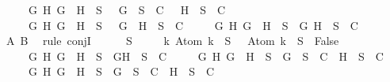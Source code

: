 \begin{isabellebody}
\ \ \ \ {\isasymand}\ {\isacharparenleft}{\isasymforall}G\ H{\isachardot}\ \isactrlbold {\isasymnot}{\isacharparenleft}G\ \isactrlbold {\isasymand}\ H{\isacharparenright}\ {\isasymin}\ S\ {\isasymlongrightarrow}\ {\isacharbraceleft}\isactrlbold {\isasymnot}\ G{\isacharbraceright}\ {\isasymunion}\ S\ {\isasymin}\ C\ {\isasymor}\ {\isacharbraceleft}\isactrlbold {\isasymnot}\ H{\isacharbraceright}\ {\isasymunion}\ S\ {\isasymin}\ C{\isacharparenright}\isanewline
\ \ \ \ {\isasymand}\ {\isacharparenleft}{\isasymforall}G\ H{\isachardot}\ \isactrlbold {\isasymnot}{\isacharparenleft}G\ \isactrlbold {\isasymor}\ H{\isacharparenright}\ {\isasymin}\ S\ {\isasymlongrightarrow}\ {\isacharbraceleft}\isactrlbold {\isasymnot}\ G{\isacharcomma}\ \isactrlbold {\isasymnot}\ H{\isacharbraceright}\ {\isasymunion}\ S\ {\isasymin}\ C{\isacharparenright}\isanewline
\ \ \ \ {\isasymand}\ {\isacharparenleft}{\isasymforall}G\ H{\isachardot}\ \isactrlbold {\isasymnot}{\isacharparenleft}G\ \isactrlbold {\isasymrightarrow}\ H{\isacharparenright}\ {\isasymin}\ S\ {\isasymlongrightarrow}\ {\isacharbraceleft}G{\isacharcomma}\isactrlbold {\isasymnot}\ H{\isacharbraceright}\ {\isasymunion}\ S\ {\isasymin}\ C{\isacharparenright}{\isacharparenright}{\isachardoublequoteclose}\isanewline
\ \ \ \ \isamarkupfalse%
\ A\ B\ \isamarkupfalse%
\ {\isacharparenleft}rule\ conjI{\isacharparenright}\isanewline
\ \ \isamarkupfalse%
\ {\isachardoublequoteopen}{\isasymbottom}\ {\isasymnotin}\ S\isanewline
\ \ \ \ {\isasymand}\ {\isacharparenleft}{\isasymforall}k{\isachardot}\ Atom\ k\ {\isasymin}\ S\ {\isasymlongrightarrow}\ \isactrlbold {\isasymnot}\ {\isacharparenleft}Atom\ k{\isacharparenright}\ {\isasymin}\ S\ {\isasymlongrightarrow}\ False{\isacharparenright}\isanewline
\ \ \ \ {\isasymand}\ {\isacharparenleft}{\isasymforall}G\ H{\isachardot}\ G\ \isactrlbold {\isasymand}\ H\ {\isasymin}\ S\ {\isasymlongrightarrow}\ {\isacharbraceleft}G{\isacharcomma}H{\isacharbraceright}\ {\isasymunion}\ S\ {\isasymin}\ C{\isacharparenright}\isanewline
\ \ \ \ {\isasymand}\ {\isacharparenleft}{\isasymforall}G\ H{\isachardot}\ G\ \isactrlbold {\isasymor}\ H\ {\isasymin}\ S\ {\isasymlongrightarrow}\ {\isacharbraceleft}G{\isacharbraceright}\ {\isasymunion}\ S\ {\isasymin}\ C\ {\isasymor}\ {\isacharbraceleft}H{\isacharbraceright}\ {\isasymunion}\ S\ {\isasymin}\ C{\isacharparenright}\isanewline
\ \ \ \ {\isasymand}\ {\isacharparenleft}{\isasymforall}G\ H{\isachardot}\ G\ \isactrlbold {\isasymrightarrow}\ H\ {\isasymin}\ S\ {\isasymlongrightarrow}\ {\isacharbraceleft}\isactrlbold {\isasymnot}G{\isacharbraceright}\ {\isasymunion}\ S\ {\isasymin}\ C\ {\isasymor}\ {\isacharbraceleft}H{\isacharbraceright}\ {\isasymunion}\ S\ {\isasymin}\ C{\isacharparenright}\isanewline

\end{isabellebody}
